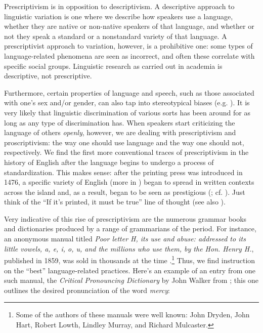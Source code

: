 \noindent Prescriptivism is in opposition to descriptivism. A descriptive approach to linguistic variation is one where we describe how speakers use a language, whether they are native or non-native speakers of that language, and whether or not they speak a standard or a nonstandard variety of that language. A prescriptivist approach to variation, however, is a prohibitive one: some types of language-related phenomena are seen as incorrect, and often these correlate with specific social groups. Linguistic research as carried out in academia is descriptive, not prescriptive.

Furthermore, certain properties of language and speech, such as those associated with one's sex and/or gender, can also tap into stereotypical biases (e.g. \citealp{Hall1985}). It is very likely that linguistic discrimination of various sorts has been around for as long as any type of discrimination has. When speakers start criticizing the language of others \textit{openly}, however, we are dealing with prescriptivism and proscriptivism: the way one should use language and the way one should not, respectively. We find the first more conventional traces of prescriptivism in the history of English after the language begins to undergo a process of standardization. This makes sense: after the printing press was introduced in 1476, a specific variety of English (more in ) began to spread in written contexts across the island and, as a result, began to be seen as prestigious (\citealp[9]{Mugglestone2003}; cf. ). Just think of the ``If it's printed, it must be true'' line of thought (see also \citealp[81]{Strang1970}).

Very indicative of this rise of prescriptivism are the numerous grammar books and dictionaries produced by a range of grammarians of the period. For instance, an anonymous manual titled \textit{Poor letter H, its use and abuse: addressed to its little vowels, a, e, i, o, u, and the millions who use them, by the Hon. Henry H.}, published in 1859, was sold in thousands at the time \citep[4]{Mugglestone2003}.\footnote{Some of the authors of these manuals were well known: John Dryden, John Hart, Robert Lowth, Lindley Murray, and Richard Mulcaster.}
Thus, we find instruction on the ``best'' language-related practices. Here's an example of an entry from one such manual, the \textit{Critical Pronouncing Dictionary} by John Walker from \citeyear{Walker1823}; this one outlines the desired pronunciation of the word \textit{mercy}: 

